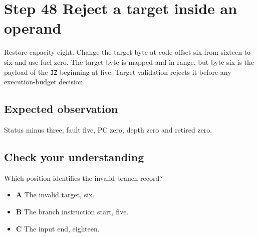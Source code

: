 \section{Step 48 Reject a target inside an operand}\label{vm-s48}

Restore capacity eight. Change the target byte at code offset six from sixteen to six and use fuel zero. The target byte is mapped and in range, but byte six is the payload of the \texttt{JZ} beginning at five. Target validation rejects it before any execution-budget decision.

\subsection{Expected observation}
Status minus three, fault five, PC zero, depth zero and retired zero.

\subsection{Check your understanding}
Which position identifies the invalid branch record?

\begin{itemize}
  \item \textbf{A} The invalid target, six.
  \item \textbf{B} The branch instruction start, five.
  \item \textbf{C} The input end, eighteen.
\end{itemize}
